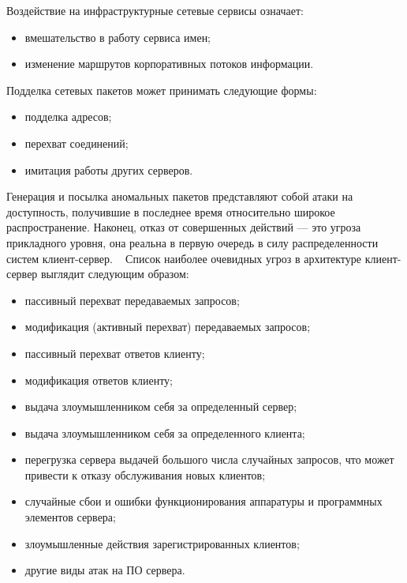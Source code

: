Воздействие на инфраструктурные сетевые сервисы означает:
\begin{itemize}
  \item вмешательство в работу сервиса имен;
  \item изменение маршрутов корпоративных потоков информации.
\end{itemize}
	
Подделка сетевых пакетов может принимать следующие формы:
\begin{itemize}
  \item подделка адресов;
  \item перехват соединений;
  \item имитация работы других серверов.
\end{itemize}
	
Генерация и посылка аномальных пакетов представляют собой атаки на доступность,
получившие в последнее время относительно широкое распространение.
Наконец, отказ от совершенных действий --- это угроза прикладного уровня, она
реальна в первую очередь в силу распределенности систем клиент-сервер.
~\cite{ComputerWeek} Список наиболее очевидных угроз в архитектуре клиент-сервер выглядит
следующим образом:
\begin{itemize}
  \item пассивный перехват передаваемых запросов;
  \item модификация (активный перехват) передаваемых запросов;    
  \item пассивный перехват ответов клиенту;
  \item модификация ответов клиенту;
  \item выдача злоумышленником себя за определенный сервер;
  \item выдача злоумышленником себя за определенного клиента;
  \item перегрузка сервера выдачей большого числа случайных запросов, что может
привести к отказу обслуживания новых клиентов; 
  \item случайные сбои и ошибки функционирования аппаратуры и программных
  элементов сервера; 
  \item злоумышленные действия зарегистрированных клиентов;
  \item другие виды атак на ПО сервера.
\end{itemize}